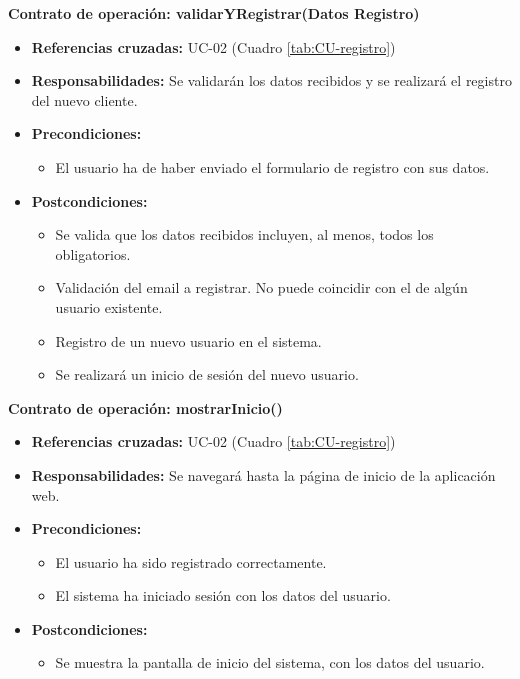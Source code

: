 \textbf{Contrato de operación: validarYRegistrar(Datos Registro)}
\begin{itemize}
\item \textbf{Referencias cruzadas:} UC-02 (Cuadro \ref{tab:CU-registro})
\item \textbf{Responsabilidades:} Se validarán los datos recibidos y se realizará el registro del nuevo cliente.
\item \textbf{Precondiciones:} 
 \begin{itemize}
\item El usuario ha de haber enviado el formulario de registro con sus datos.
\end {itemize}
\item \textbf{Postcondiciones:} 
 \begin{itemize}
\item Se valida que los datos recibidos incluyen, al menos, todos los obligatorios.
\item Validación del email a registrar. No puede coincidir con el de algún usuario existente.
\item Registro de un nuevo usuario en el sistema.
\item Se realizará un inicio de sesión del nuevo usuario.
\end {itemize}
\end {itemize}

\textbf{Contrato de operación: mostrarInicio()}
\begin{itemize}
\item \textbf{Referencias cruzadas:} UC-02 (Cuadro \ref{tab:CU-registro})
\item \textbf{Responsabilidades:} Se navegará hasta la página de inicio de la aplicación web.
\item \textbf{Precondiciones:} 
 \begin{itemize}
\item El usuario ha sido registrado correctamente.
\item El sistema ha iniciado sesión con los datos del usuario.
\end {itemize}
\item \textbf{Postcondiciones:} 
 \begin{itemize}
\item Se muestra la pantalla de inicio del sistema, con los datos del usuario.
\end {itemize}
\end {itemize}

\vspace{7mm}
\dotfill
\vspace{7mm}

